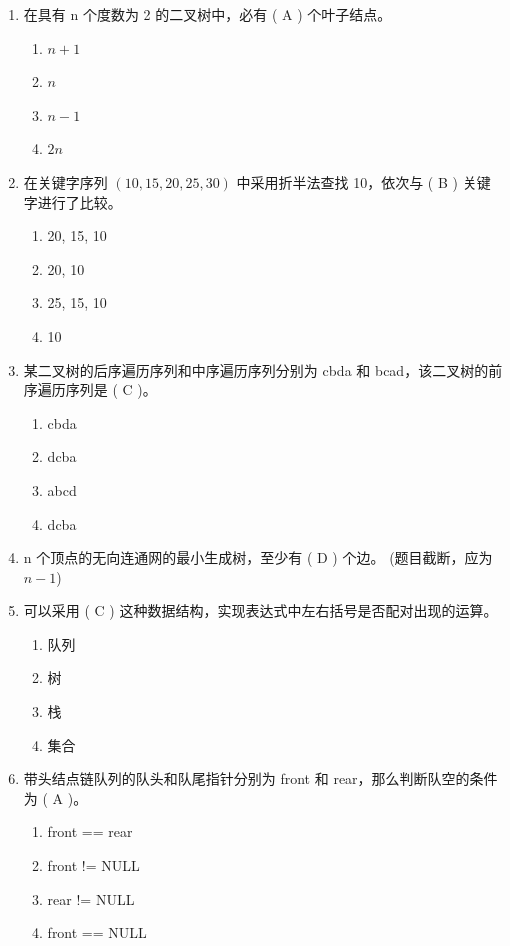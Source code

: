 \documentclass[12pt, a4paper]{article}
\begin{document}
\begin{enumerate}[label=\arabic*.]
    \item 在具有 n 个度数为 2 的二叉树中，必有 ( A ) 个叶子结点。
    \begin{enumerate}
        \item $n+1$
        \item $n$
        \item $n-1$
        \item $2n$
    \end{enumerate}

    \item 在关键字序列 $(10, 15, 20, 25, 30)$ 中采用折半法查找 10，依次与 ( B ) 关键字进行了比较。
    \begin{enumerate}
        \item 20, 15, 10
        \item 20, 10
        \item 25, 15, 10
        \item 10
    \end{enumerate}

    \item 某二叉树的后序遍历序列和中序遍历序列分别为 cbda 和 bcad，该二叉树的前序遍历序列是 ( C )。
    \begin{enumerate}
        \item cbda
        \item dcba
        \item abcd
        \item dcba
    \end{enumerate}

    \item n 个顶点的无向连通网的最小生成树，至少有 ( D ) 个边。 (题目截断，应为 $n-1$)
    
    \item 可以采用 ( C ) 这种数据结构，实现表达式中左右括号是否配对出现的运算。
    \begin{enumerate}
        \item 队列
        \item 树
        \item 栈
        \item 集合
    \end{enumerate}

    \item 带头结点链队列的队头和队尾指针分别为 front 和 rear，那么判断队空的条件为 ( A )。
    \begin{enumerate}
        \item front == rear
        \item front != NULL
        \item rear != NULL
        \item front == NULL
    \end{enumerate}


\end{enumerate}
\end{document}
